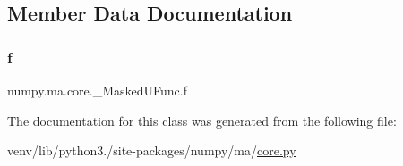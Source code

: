 \subsection{Member Data Documentation}
\mbox{\label{classnumpy_1_1ma_1_1core_1_1__MaskedUFunc_a5c846abb4468646636e37165b9ba33ac}} 
\subsubsection{\texorpdfstring{f}{f}}
{\footnotesize\ttfamily numpy.\+ma.\+core.\+\_\+\+Masked\+U\+Func.\+f}



The documentation for this class was generated from the following file\+:\begin{DoxyCompactItemize}
\item 
venv/lib/python3./site-\/packages/numpy/ma/\hyperlink{numpy_2ma_2core_8py}{core.\+py}\end{DoxyCompactItemize}
